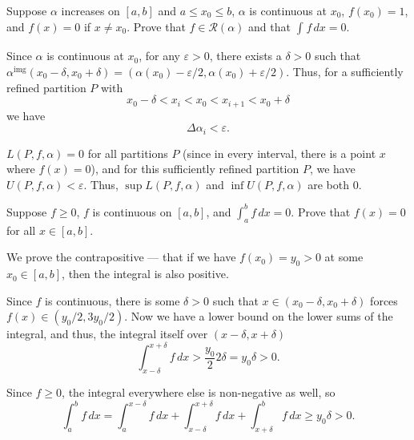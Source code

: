 \documentclass[12 pt, letterpaper]{hmcpset}
\begin{document}
\begin{problem}[1.]
	Suppose $\alpha$ increases on $[a, b]$ and  $a \le x_{0} \le b$, $\alpha$ is continuous at $x_{0}$, $f(x_{0}) = 1$, and $f(x) = 0$ if $x \neq x_{0}$. Prove that $f \in \mathscr{R}(\alpha)$ and that $\int_{}  f \, dx = 0$.
\end{problem}

\begin{solution}
	Since $\alpha$ is continuous at $x_{0}$, for any $\varepsilon > 0$, there exists a  $\delta > 0$ such that $\alpha^{\text{img}} (x_{0} - \delta, x_{0} + \delta) = (\alpha(x_{0}) - \varepsilon/2, \alpha(x_{0}) + \varepsilon/2)$. Thus, for a sufficiently refined partition $P$ with
	\[
		x_{0} - \delta < x_{i} < x_{0} < x_{i + 1} < x_{0} + \delta
	\]
	we have \[
		\Delta \alpha_{i} < \varepsilon.
	\]

	$L(P, f, \alpha) = 0$ for all partitions $P$ (since in every interval, there is a point $x$ where $f(x) = 0$), and for this sufficiently refined partition $P$, we have $U(P, f, \alpha) < \varepsilon$. Thus, $\sup L(P, f, \alpha)$ and $\inf U(P, f, \alpha)$ are both $0$.
\end{solution}

\pagebreak

\begin{problem}[2. $\star$]
	Suppose $f \ge 0$, $f$ is continuous on $[a, b]$, and $\int_{a}^{b} f \, dx = 0$. Prove that $f(x) = 0$ for all $x \in [a, b]$.
\end{problem}

\begin{solution}
	We prove the contrapositive --- that if we have $f(x_{0}) = y_{0} > 0$ at some $x_{0} \in [a, b]$, then the integral is also positive.

	Since $f$ is continuous, there is some $\delta > 0$ such that $x \in (x_{0} - \delta, x_{0} + \delta)$  forces $f(x) \in (y_{0}/2, 3 y_{0}/2)$. Now we have a lower bound on the lower sums of the integral, and thus, the integral itself over $(x - \delta, x + \delta)$
	\[
		\int_{x - \delta}^{x + \delta} f \, dx > \frac{y_{0}}{2} 2 \delta = y_{0} \delta > 0.
	\]

	Since $f \ge 0$, the integral everywhere else is non-negative as well, so
	\[
		\int_{a}^{b} f \, dx = \int_{a}^{x - \delta} f \, dx + \int_{x - \delta}^{x + \delta} f \, dx + \int_{x + \delta}^{b} f \, dx \ge y_{0} \delta > 0.
	\]
\end{solution}

\pagebreak
\end{document}
